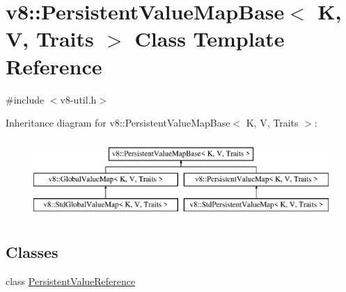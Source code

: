 \hypertarget{classv8_1_1_persistent_value_map_base}{}\section{v8\+:\+:Persistent\+Value\+Map\+Base$<$ K, V, Traits $>$ Class Template Reference}
\label{classv8_1_1_persistent_value_map_base}


{\ttfamily \#include $<$v8-\/util.\+h$>$}

Inheritance diagram for v8\+:\+:Persistent\+Value\+Map\+Base$<$ K, V, Traits $>$\+:\begin{figure}[H]
\begin{center}
\leavevmode
\includegraphics[height=3.000000cm]{classv8_1_1_persistent_value_map_base}
\end{center}
\end{figure}
\subsection*{Classes}
\begin{DoxyCompactItemize}
\item 
class \hyperlink{classv8_1_1_persistent_value_map_base_1_1_persistent_value_reference}{Persistent\+Value\+Reference}
\end{DoxyCompactItemize}
